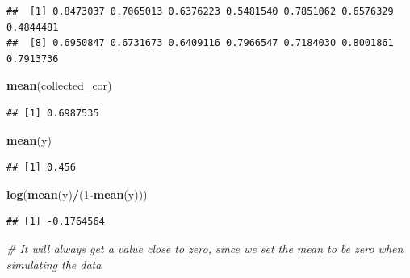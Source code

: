 \documentclass[]{book}
\newenvironment{Shaded}{\begin{snugshade}}{\end{snugshade}}
\newcommand{\CommentTok}[1]{\textcolor[rgb]{0.56,0.35,0.01}{\textit{#1}}}
\newcommand{\DecValTok}[1]{\textcolor[rgb]{0.00,0.00,0.81}{#1}}
\newcommand{\KeywordTok}[1]{\textcolor[rgb]{0.13,0.29,0.53}{\textbf{#1}}}
\newcommand{\NormalTok}[1]{#1}
\newcommand{\OperatorTok}[1]{\textcolor[rgb]{0.81,0.36,0.00}{\textbf{#1}}}
\begin{document}
\begin{verbatim}
##  [1] 0.8473037 0.7065013 0.6376223 0.5481540 0.7851062 0.6576329 0.4844481
##  [8] 0.6950847 0.6731673 0.6409116 0.7966547 0.7184030 0.8001861 0.7913736
\end{verbatim}

\begin{Shaded}
\begin{Highlighting}[]
\KeywordTok{mean}\NormalTok{(collected_cor)}
\end{Highlighting}
\end{Shaded}

\begin{verbatim}
## [1] 0.6987535
\end{verbatim}

\begin{Shaded}
\begin{Highlighting}[]
\KeywordTok{mean}\NormalTok{(y)}
\end{Highlighting}
\end{Shaded}

\begin{verbatim}
## [1] 0.456
\end{verbatim}

\begin{Shaded}
\begin{Highlighting}[]
\KeywordTok{log}\NormalTok{(}\KeywordTok{mean}\NormalTok{(y)}\OperatorTok{/}\NormalTok{(}\DecValTok{1}\OperatorTok{-}\KeywordTok{mean}\NormalTok{(y)))}
\end{Highlighting}
\end{Shaded}

\begin{verbatim}
## [1] -0.1764564
\end{verbatim}

\begin{Shaded}
\begin{Highlighting}[]
\CommentTok{# It will always get a value close to zero, since we set the mean to be zero when simulating the data}
\end{Highlighting}
\end{Shaded}


\end{document}
